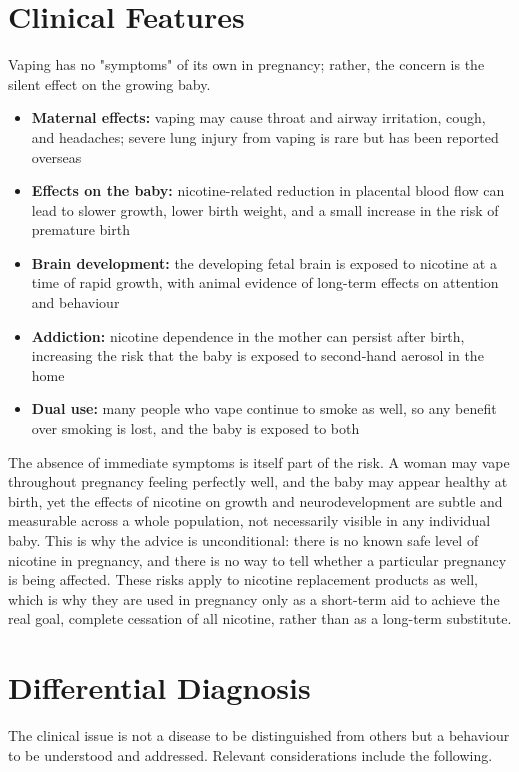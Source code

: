 \section*{Clinical Features}
Vaping has no "symptoms" of its own in pregnancy; rather, the concern is the silent effect on the growing baby.

\begin{itemize}
    \item \textbf{Maternal effects:} vaping may cause throat and airway irritation, cough, and headaches; severe lung injury from vaping is rare but has been reported overseas
    \item \textbf{Effects on the baby:} nicotine-related reduction in placental blood flow can lead to slower growth, lower birth weight, and a small increase in the risk of premature birth
    \item \textbf{Brain development:} the developing fetal brain is exposed to nicotine at a time of rapid growth, with animal evidence of long-term effects on attention and behaviour
    \item \textbf{Addiction:} nicotine dependence in the mother can persist after birth, increasing the risk that the baby is exposed to second-hand aerosol in the home
    \item \textbf{Dual use:} many people who vape continue to smoke as well, so any benefit over smoking is lost, and the baby is exposed to both
\end{itemize}

The absence of immediate symptoms is itself part of the risk. A woman may vape throughout pregnancy feeling perfectly well, and the baby may appear healthy at birth, yet the effects of nicotine on growth and neurodevelopment are subtle and measurable across a whole population, not necessarily visible in any individual baby. This is why the advice is unconditional: there is no known safe level of nicotine in pregnancy, and there is no way to tell whether a particular pregnancy is being affected. These risks apply to nicotine replacement products as well, which is why they are used in pregnancy only as a short-term aid to achieve the real goal, complete cessation of all nicotine, rather than as a long-term substitute.

\section*{Differential Diagnosis}
The clinical issue is not a disease to be distinguished from others but a behaviour to be understood and addressed. Relevant considerations include the following.

